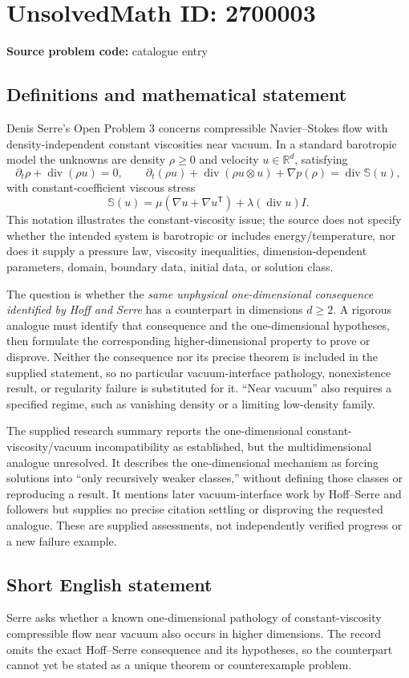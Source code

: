 \documentclass[11pt]{article}
\newcommand{\R}{\mathbb{R}}
\begin{document}
\section*{UnsolvedMath ID: 2700003}
\textbf{Source problem code:} catalogue entry
\subsection{Definitions and mathematical statement}
Denis Serre's Open Problem 3 concerns compressible Navier--Stokes flow with density-independent constant viscosities near vacuum. In a standard barotropic model the unknowns are density $\rho\geq0$ and velocity $u\in\R^d$, satisfying
\[
\partial_t\rho+\operatorname{div}(\rho u)=0,
\qquad
\partial_t(\rho u)+\operatorname{div}(\rho u\otimes u)+\nabla p(\rho)
=\operatorname{div}\mathbb S(u),
\]
with constant-coefficient viscous stress
\[
\mathbb S(u)=\mu(\nabla u+\nabla u^{\mathsf T})
+\lambda(\operatorname{div}u)I.
\]
This notation illustrates the constant-viscosity issue; the source does not specify whether the intended system is barotropic or includes energy/temperature, nor does it supply a pressure law, viscosity inequalities, dimension-dependent parameters, domain, boundary data, initial data, or solution class.

The question is whether the \emph{same unphysical one-dimensional consequence identified by Hoff and Serre} has a counterpart in dimensions $d\geq2$. A rigorous analogue must identify that consequence and the one-dimensional hypotheses, then formulate the corresponding higher-dimensional property to prove or disprove. Neither the consequence nor its precise theorem is included in the supplied statement, so no particular vacuum-interface pathology, nonexistence result, or regularity failure is substituted for it. ``Near vacuum'' also requires a specified regime, such as vanishing density or a limiting low-density family.

The supplied research summary reports the one-dimensional constant-viscosity/vacuum incompatibility as established, but the multidimensional analogue unresolved. It describes the one-dimensional mechanism as forcing solutions into ``only recursively weaker classes,'' without defining those classes or reproducing a result. It mentions later vacuum-interface work by Hoff--Serre and followers but supplies no precise citation settling or disproving the requested analogue. These are supplied assessments, not independently verified progress or a new failure example.
\subsection{Short English statement}
Serre asks whether a known one-dimensional pathology of constant-viscosity compressible flow near vacuum also occurs in higher dimensions. The record omits the exact Hoff--Serre consequence and its hypotheses, so the counterpart cannot yet be stated as a unique theorem or counterexample problem.
\end{document}
